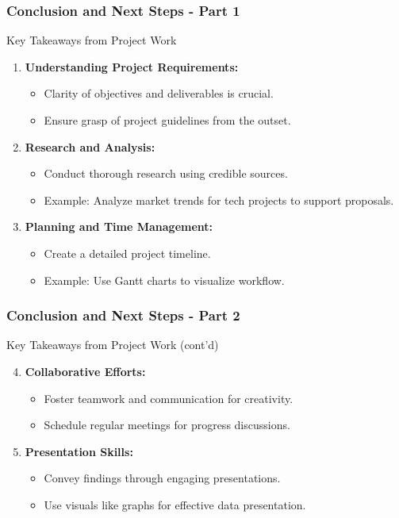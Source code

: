 \documentclass[aspectratio=169]{beamer}
\begin{document}
\begin{frame}[fragile]
  \frametitle{Conclusion and Next Steps - Part 1}
  \begin{block}{Key Takeaways from Project Work}
    \begin{enumerate}
      \item \textbf{Understanding Project Requirements:}
        \begin{itemize}
          \item Clarity of objectives and deliverables is crucial.
          \item Ensure grasp of project guidelines from the outset.
        \end{itemize}
      \item \textbf{Research and Analysis:}
        \begin{itemize}
          \item Conduct thorough research using credible sources.
          \item Example: Analyze market trends for tech projects to support proposals.
        \end{itemize}
      \item \textbf{Planning and Time Management:}
        \begin{itemize}
          \item Create a detailed project timeline.
          \item Example: Use Gantt charts to visualize workflow.
        \end{itemize}
    \end{enumerate}
  \end{block}
\end{frame}

\begin{frame}[fragile]
  \frametitle{Conclusion and Next Steps - Part 2}
  \begin{block}{Key Takeaways from Project Work (cont'd)}
    \begin{enumerate}
      \setcounter{enumi}{3} %
      \item \textbf{Collaborative Efforts:}
        \begin{itemize}
          \item Foster teamwork and communication for creativity.
          \item Schedule regular meetings for progress discussions.
        \end{itemize}
      \item \textbf{Presentation Skills:}
        \begin{itemize}
          \item Convey findings through engaging presentations.
          \item Use visuals like graphs for effective data presentation.
        \end{itemize}
    \end{enumerate}
  \end{block}
\end{frame}
\end{document}
